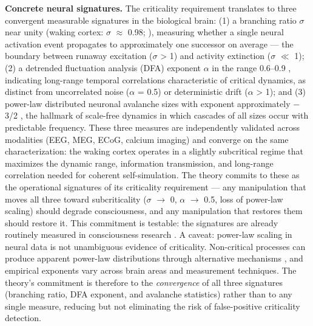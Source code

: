 \documentclass[12pt]{article}
\begin{document}
\textbf{Concrete neural signatures.} The criticality requirement translates to three convergent measurable signatures in the biological brain: (1) a branching ratio $\sigma$ near unity (waking cortex: $\sigma$ $\approx$ 0.98; \citealp{Priesemann2014}), measuring whether a single neural activation event propagates to approximately one successor on average --- the boundary between runaway excitation ($\sigma$ > 1) and activity extinction ($\sigma$ $\ll$ 1); (2) a detrended fluctuation analysis (DFA) exponent $\alpha$ in the range 0.6--0.9 \citep{Hardstone2012}, indicating long-range temporal correlations characteristic of critical dynamics, as distinct from uncorrelated noise ($\alpha$ = 0.5) or deterministic drift ($\alpha$ > 1); and (3) power-law distributed neuronal avalanche sizes with exponent approximately $-$3/2 \citep{Beggs2003}, the hallmark of scale-free dynamics in which cascades of all sizes occur with predictable frequency. These three measures are independently validated across modalities (EEG, MEG, ECoG, calcium imaging) and converge on the same characterization: the waking cortex operates in a slightly subcritical regime that maximizes the dynamic range, information transmission, and long-range correlation needed for coherent self-simulation. The theory commits to these as the operational signatures of its criticality requirement --- any manipulation that moves all three toward subcriticality ($\sigma$ $\rightarrow$ 0, $\alpha$ $\rightarrow$ 0.5, loss of power-law scaling) should degrade consciousness, and any manipulation that restores them should restore it. This commitment is testable: the signatures are already routinely measured in consciousness research \citep{Priesemann2014,Tagliazucchi2016,AlgomShriki2026}. A caveat: power-law scaling in neural data is not unambiguous evidence of criticality. Non-critical processes can produce apparent power-law distributions through alternative mechanisms \citep{TouboulDestexhe2017}, and empirical exponents vary across brain areas and measurement techniques. The theory's commitment is therefore to the \emph{convergence} of all three signatures (branching ratio, DFA exponent, and avalanche statistics) rather than to any single measure, reducing but not eliminating the risk of false-positive criticality detection.
\end{document}
